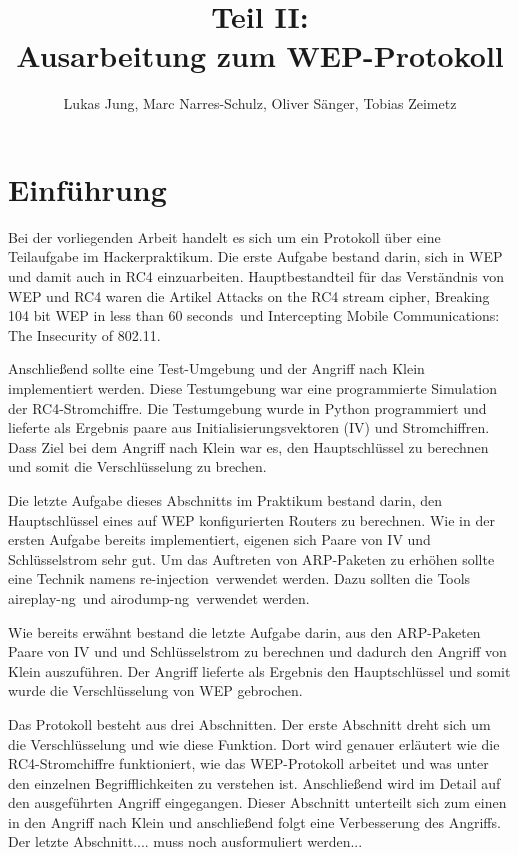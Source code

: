 \documentclass[10pt,a4paper]{article}
\title{Teil II:\\Ausarbeitung zum WEP-Protokoll}
\author{Lukas Jung, Marc Narres-Schulz, Oliver Sänger, Tobias Zeimetz}
\begin{document}
\maketitle
\tableofcontents
\newpage

\section{Einführung}
Bei der vorliegenden Arbeit handelt es sich um ein Protokoll über eine Teilaufgabe im \glqq Hackerpraktikum\grqq. Die erste Aufgabe bestand darin, sich in WEP und damit auch in RC4 einzuarbeiten. Hauptbestandteil für das Verständnis von WEP und RC4 waren die Artikel \glqq Attacks on the RC4 stream cipher\grqq, \glqq Breaking 104 bit WEP in less than 60 seconds\grqq \ und \glqq Intercepting Mobile Communications: The Insecurity of 802.11\grqq.

Anschließend sollte eine Test-Umgebung und der Angriff nach Klein implementiert werden. Diese Testumgebung war eine programmierte Simulation der RC4-Stromchiffre. Die Testumgebung wurde in Python programmiert und lieferte als Ergebnis paare aus Initialisierungsvektoren (IV) und Stromchiffren. Dass Ziel bei dem Angriff nach Klein war es, den Hauptschlüssel zu berechnen und somit die Verschlüsselung zu brechen. 

Die letzte Aufgabe dieses Abschnitts im Praktikum bestand darin, den Hauptschlüssel eines auf WEP konfigurierten Routers zu berechnen. Wie in der ersten Aufgabe bereits implementiert, eigenen sich Paare von IV und Schlüsselstrom sehr gut. Um das Auftreten von ARP-Paketen zu erhöhen sollte eine Technik namens \glqq re-injection\grqq \ verwendet werden.  Dazu sollten die Tools \glqq aireplay-ng\grqq \ und \glqq airodump-ng\grqq \ verwendet werden.

Wie bereits erwähnt bestand die letzte Aufgabe darin, aus den ARP-Paketen Paare von IV und und Schlüsselstrom zu berechnen und dadurch den Angriff von Klein auszuführen. Der Angriff lieferte als Ergebnis den Hauptschlüssel und somit wurde die Verschlüsselung von WEP gebrochen.

Das Protokoll besteht aus drei Abschnitten. Der erste Abschnitt dreht sich um die Verschlüsselung und wie diese Funktion. Dort wird genauer erläutert wie die RC4-Stromchiffre funktioniert, wie das WEP-Protokoll arbeitet und was unter den einzelnen Begrifflichkeiten zu verstehen ist. Anschließend wird im Detail auf den ausgeführten Angriff eingegangen. Dieser Abschnitt unterteilt sich zum einen in den Angriff nach Klein und anschließend folgt eine Verbesserung des Angriffs. Der letzte Abschnitt.... muss noch ausformuliert werden...
\end{document}
